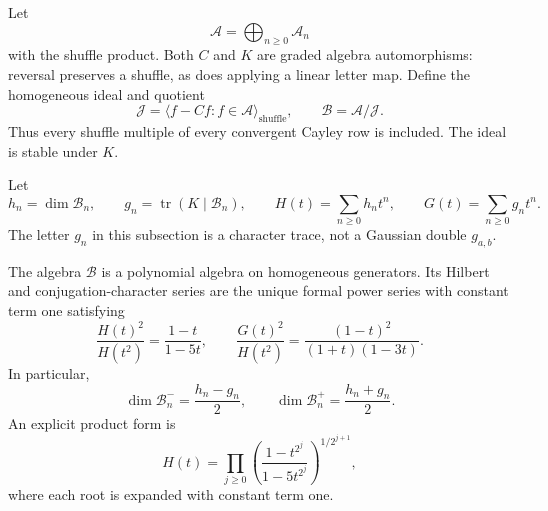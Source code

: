 Let
\[
 \mathcal A=\bigoplus_{n\ge0}\mathcal A_n
\]
with the shuffle product.  Both $C$ and $K$ are graded algebra
automorphisms: reversal preserves a shuffle, as does applying a linear
letter map.  Define the homogeneous ideal and quotient
\[
 \mathcal J=\langle f-Cf:f\in\mathcal A\rangle_{\mathrm{shuffle}},
 \qquad \mathcal B=\mathcal A/\mathcal J.
\]
Thus every shuffle multiple of every convergent Cayley row is included.
The ideal is stable under $K$.

Let
\[
 h_n=\dim\mathcal B_n,\qquad
 g_n=\operatorname{tr}(K\mid\mathcal B_n),\qquad
 H(t)=\sum_{n\ge0}h_nt^n,\qquad G(t)=\sum_{n\ge0}g_nt^n.
\]
The letter $g_n$ in this subsection is a character trace, not a
Gaussian double $g_{a,b}$.

\begin{theorem}
\label{cayley:thm:ideal}
The algebra $\mathcal B$ is a polynomial algebra on homogeneous
generators.  Its Hilbert and conjugation-character series are the unique
formal power series with constant term one satisfying
\begin{equation}\label{cayley:eq:hilbert}
 \frac{H(t)^2}{H(t^2)}=\frac{1-t}{1-5t},
 \qquad
 \frac{G(t)^2}{H(t^2)}
   =\frac{(1-t)^2}{(1+t)(1-3t)}.
\end{equation}
In particular,
\[
 \dim\mathcal B_n^-=\frac{h_n-g_n}{2},
 \qquad
 \dim\mathcal B_n^+=\frac{h_n+g_n}{2}.
\]
An explicit product form is
\begin{equation}\label{cayley:eq:dyadic-product}
 H(t)=\prod_{j\ge0}
 \left(\frac{1-t^{2^j}}{1-5t^{2^j}}\right)^{1/2^{j+1}},
\end{equation}
where each root is expanded with constant term one.
\end{theorem}

